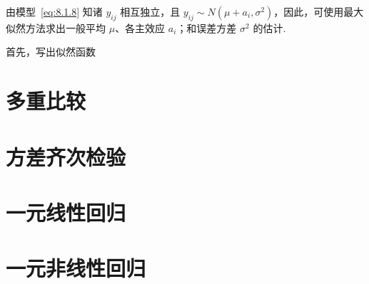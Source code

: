 由模型~\eqref{eq:8.1.8} 知诸 $y_{ij}$ 相互独立，且 $y_{ij}\sim N(\mu+a_i,\sigma^2)$，因此，可使用最大似然方法求出一般平均 $\mu$、各主效应 $a_i$；和误差方差 $\sigma^2$ 的估计.

首先，写出似然函数

\section{多重比较}\label{sec:8.2}

\section{方差齐次检验}\label{sec:8.3}

\section{一元线性回归}\label{sec:8.4}

\section{一元非线性回归}\label{sec:8.5}